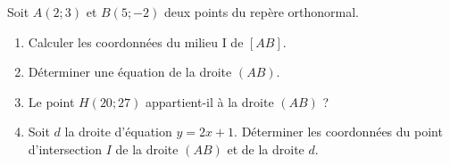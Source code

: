 
Soit $A(2;3)$ et $B(5;-2)$ deux points du repère \Oij orthonormal.
\begin{enumerate}
\item Calculer les coordonnées du milieu I de $[AB]$.
\item Déterminer une équation de la droite $(AB)$.
\item Le point $H(20;27)$ appartient-il à la droite $(AB)$ ?
\item Soit $d$ la droite d'équation $y=2x+1$. Déterminer les coordonnées du point d'intersection $I$  de la droite $(AB)$ et de la droite $d$.
\end{enumerate}